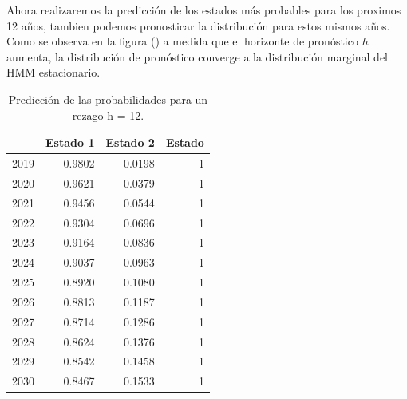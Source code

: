 \documentclass[a4paper]{article}\usepackage[]{graphicx}\usepackage[]{color}
\begin{document}
Ahora realizaremos la predicción de los estados más probables para los proximos 12 años, tambien podemos pronosticar la distribución para estos mismos años. Como se observa en la figura () a medida que el horizonte de pronóstico $h$ aumenta, la distribución de pronóstico converge a la distribución marginal del HMM estacionario.

\begin{table}[ht]
\centering
\begin{tabular}{rrrr}
  \hline
 & Estado 1 & Estado 2 & Estado \\ 
  \hline
2019 & 0.9802 & 0.0198 &     1 \\ 
  2020 & 0.9621 & 0.0379 &     1 \\ 
  2021 & 0.9456 & 0.0544 &     1 \\ 
  2022 & 0.9304 & 0.0696 &     1 \\ 
  2023 & 0.9164 & 0.0836 &     1 \\ 
  2024 & 0.9037 & 0.0963 &     1 \\ 
  2025 & 0.8920 & 0.1080 &     1 \\ 
  2026 & 0.8813 & 0.1187 &     1 \\ 
  2027 & 0.8714 & 0.1286 &     1 \\ 
  2028 & 0.8624 & 0.1376 &     1 \\ 
  2029 & 0.8542 & 0.1458 &     1 \\ 
  2030 & 0.8467 & 0.1533 &     1 \\ 
   \hline
\end{tabular}
\caption{Predicción de las probabilidades para un rezago h = 12.} 
\end{table}
\end{document}
